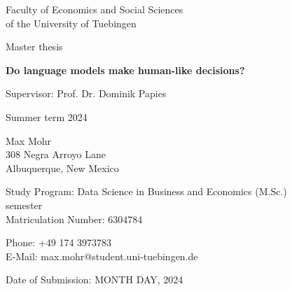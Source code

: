 \documentclass[12pt, a4paper, titlepage]{article}
\begin{document}
\begin{titlepage}
  \begin{center}
    Faculty of Economics and Social Sciences\\
    of the University of Tuebingen

    \vspace{3cm}

    Master thesis

    \vspace{1cm}

    {\Large\textbf{Do language models make human-like decisions?}}

    \vspace{0.5cm}

    Supervisor: Prof. Dr. Dominik Papies

    \vspace{0.5cm}

    Summer term 2024

  \end{center}

  \vfill

  \begin{multicols}{2}

    Max Mohr\\
    308 Negra Arroyo Lane\\
    Albuquerque, New Mexico

    \vfill

    Study Program: Data Science in Business and Economics (M.Sc.)\\
     semester\\
    Matriculation Number: 6304784
  \end{multicols}

  \begin{multicols}{2}
    Phone: +49 174 3973783\\
    E-Mail: max.mohr@student.uni-tuebingen.de\\

    \vfill

    Date of Submission: MONTH DAY, 2024

  \end{multicols}
\end{titlepage}


\newpage
{} %
\setcounter{page}{2}
\tableofcontents


\clearpage
{} %
\end{document}
